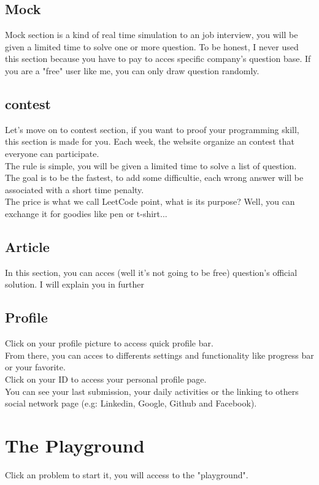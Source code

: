 \documentclass[12pt, letterpaper]{article}
\begin{document}
\subsection{Mock}
Mock section is a kind of real time simulation to an job interview, you will be given a limited time to solve one or more question. To be honest, I never used this section because you have to pay to acces specific company's question base. If you are a "free" user like me, you can only draw question randomly.

\subsection{contest}
Let's move on to contest section, if you want to proof your programming skill, this section is made for you.
Each week, the website organize an contest that everyone can participate. \\
The rule is simple, you will be given a limited time to solve a list of question.\\
The goal is to be the fastest, to add some difficultie, each wrong answer will be associated with a short time penalty.\\
The price is what we call LeetCode point, what is its purpose? Well, you can exchange it for goodies like pen or t-shirt...

\subsection{Article}
In this section, you can acces (well it's not going to be free) question's official solution.
I will explain you in further

\subsection{Profile}
Click on your profile picture to access quick profile bar.\\
From there, you can acces to differents settings and functionality like progress bar or your favorite.\\
Click on your ID to access your personal profile page.\\
You can see your last submission, your daily activities or the linking to others social network page (e.g: Linkedin, Google, Github and Facebook).

\section{The Playground}
Click an problem to start it, you will access to the "playground".\\
\end{document}
